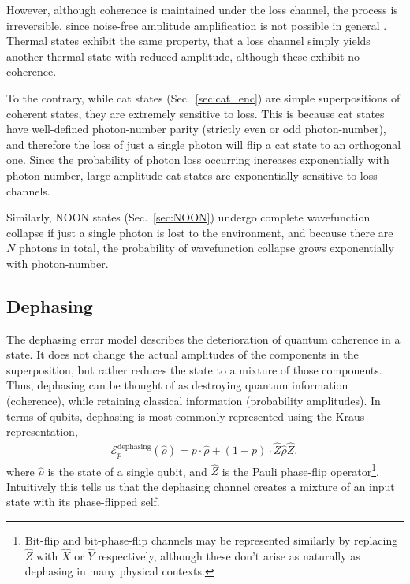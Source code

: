 \documentclass[aps,rmp,twocolumn,amsmath,amssymb,nofootinbib,superscriptaddress,longbibliography,floatfix,table-of-contents,eqsecnum]{revtex4-1}
\begin{document}
However, although coherence is maintained under the loss channel, the process is irreversible, since noise-free amplitude amplification is not possible in general \cite{???}. Thermal states exhibit the same property, that a loss channel simply yields another thermal state with reduced amplitude, although these exhibit no coherence.

To the contrary, while cat states (Sec.~\ref{sec:cat_enc}) are simple superpositions of coherent states, they are extremely sensitive to loss. This is because cat states have well-defined photon-number parity (strictly even or odd photon-number), and therefore the loss of just a single photon will flip a cat state to an orthogonal one. Since the probability of photon loss occurring increases exponentially with photon-number, large amplitude cat states are exponentially sensitive to loss channels.

Similarly, NOON states (Sec.~\ref{sec:NOON}) undergo complete wavefunction collapse if just a single photon is lost to the environment, and because there are $N$ photons in total, the probability of wavefunction collapse grows exponentially with photon-number.

%
%

\subsection{Dephasing} \label{sec:dephasing_error} 

The dephasing error model describes the deterioration of quantum coherence in a state. It does not change the actual amplitudes of the components in the superposition, but rather reduces the state to a mixture of those components. Thus, dephasing can be thought of as destroying quantum information (coherence), while retaining classical information (probability amplitudes). In terms of qubits, dephasing is most commonly represented using the Kraus representation,
\begin{align} \label{eq:dephasing_channel}
\mathcal{E}_p^\text{dephasing}(\hat\rho) = p\cdot\hat\rho + (1-p)\cdot \hat{Z}\hat\rho\hat{Z},
\end{align}
where $\hat\rho$ is the state of a single qubit, and $\hat{Z}$ is the Pauli phase-flip operator\footnote{Bit-flip and bit-phase-flip channels may be represented similarly by replacing $\hat{Z}$ with $\hat{X}$ or $\hat{Y}$ respectively, although these don't arise as naturally as dephasing in many physical contexts.}. Intuitively this tells us that the dephasing channel creates a mixture of an input state with its phase-flipped self.
\end{document}
